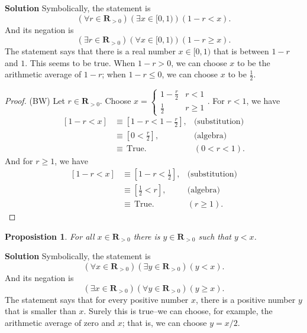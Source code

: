 \documentclass[12pt,fleqn,answers]{exam}
\newcommand{\reals}{\mathbf{R}}
\newcommand{\true}{\, \mathrm{True}}
\newenvironment{myproof}
  {\begin{shaded}\begin{proof}}
  {\end{proof}\end{shaded}}
\newtheorem{prop}{Proposistion}
\begin{document}
    \noindent \textbf{Solution} Symbolically, the statement is 
    \begin{equation*}
      \left(\forall r \in \reals_{>0}\right)\left(\exists x \in [0,1)\right)\left(1-r < x\right).
    \end{equation*}
    And its negation is 
     \begin{equation*}
       \left(\exists r \in \reals_{>0}\right)\left(\forall x \in [0,1)\right)\left(1-r \geq  x\right).
    \end{equation*}
     The statement says that there is a real number $x \in [0,1)$ that is between $1-r$ and $1$. This seems
     to be true. When $1-r > 0$, we can choose $x$ to be the arithmetic average of $1-r$; when $1-r \leq 0$,
     we can choose $x$ to be $\frac{1}{2}$.
     
      \begin{myproof} (BW) Let $r \in \reals_{>0}$. Choose $x = \begin{cases} 1 - \frac{r}{2}  & r < 1 \\ \frac{1}{2} & r \geq 1 \end{cases}$. For $r < 1$, we have
      \begin{align*}
       \left[1-r < x \right] &\equiv \left[1-r < 1 - \frac{r}{2}  \right], & \mbox{(substitution)} \\
                                  &\equiv  \left[0 <  \frac{r}{2}  \right], & \mbox{(algebra)} \\
                                  &\equiv \true.   &(0 < r < 1).
      \end{align*}
      And for $r \geq 1$, we have
       \begin{align*}
       \left[1-r < x \right] &\equiv \left[1-r < \frac{1}{2}  \right], & \mbox{(substitution)} \\
                                  &\equiv  \left[\frac{1}{2}  <  r  \right], & \mbox{(algebra)} \\
                                  &\equiv \true.   &(r \geq 1).
      \end{align*}
      \end{myproof}
     

    \begin{prop}   For all $x \in \reals_{>0}$ there is 
      $y \in \reals_{> 0}$ such that $y < x$. 
    \end{prop}
     
    \noindent \textbf{Solution} Symbolically, the statement is 
      \begin{equation*}
         \left(\forall x \in \reals_{>0}\right) \left(\exists y \in \reals_{>0}\right)(y < x).
      \end{equation*}
      And its negation is
       \begin{equation*}
         \left(\exists x \in \reals_{>0}\right) \left(\forall y \in \reals_{>0}\right)(y \geq  x).
      \end{equation*}
      The statement says that for every positive number $x$, there is a positive number $y$ that is smaller than $x$. 
      Surely this is true--we can choose, for example, the 
      arithmetic average of zero and $x$; that is, we can choose    
      $y=x/2$.
      
\end{document}
